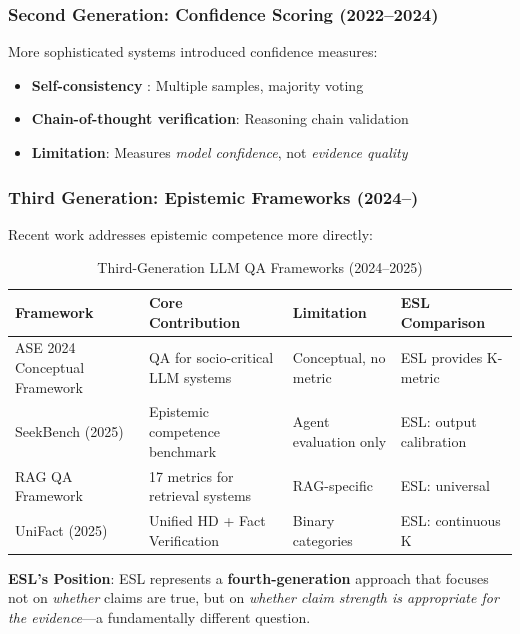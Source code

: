 \documentclass[11pt,a4paper]{article}
\begin{document}
\subsubsection{Second Generation: Confidence Scoring (2022--2024)}

More sophisticated systems introduced confidence measures:
\begin{itemize}
    \item \textbf{Self-consistency} \citep{Wang2023}: Multiple samples, majority voting
    \item \textbf{Chain-of-thought verification}: Reasoning chain validation
    \item \textbf{Limitation}: Measures \textit{model confidence}, not \textit{evidence quality}
\end{itemize}

\subsubsection{Third Generation: Epistemic Frameworks (2024--)}

Recent work addresses epistemic competence more directly:

\begin{table}[h]
\centering
\caption{Third-Generation LLM QA Frameworks (2024--2025)}
\label{tab:llm-qa-frameworks}
\begin{tabular}{p{3cm}p{4cm}p{4cm}p{2.5cm}}
\toprule
\textbf{Framework} & \textbf{Core Contribution} & \textbf{Limitation} & \textbf{ESL Comparison} \\
\midrule
ASE 2024 Conceptual Framework & QA for socio-critical LLM systems & Conceptual, no metric & ESL provides K-metric \\
SeekBench (2025) & Epistemic competence benchmark & Agent evaluation only & ESL: output calibration \\
RAG QA Framework & 17 metrics for retrieval systems & RAG-specific & ESL: universal \\
UniFact (2025) & Unified HD + Fact Verification & Binary categories & ESL: continuous K \\
\bottomrule
\end{tabular}
\end{table}

\textbf{ESL's Position}: ESL represents a \textbf{fourth-generation} approach that focuses not on \textit{whether} claims are true, but on \textit{whether claim strength is appropriate for the evidence}---a fundamentally different question.
\end{document}
